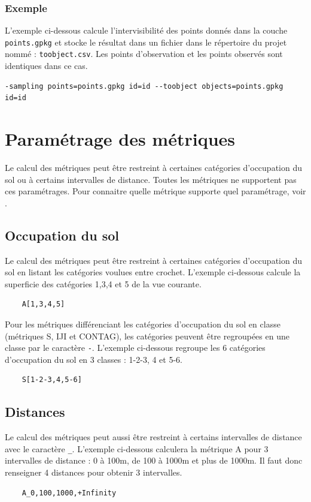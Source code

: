 \documentclass{report}
\begin{document}
\subsubsection{Exemple}
L'exemple ci-dessous calcule l'intervisibilité des points donnés dans la couche \verb|points.gpkg| et stocke le résultat dans un fichier dans le répertoire du projet nommé : \verb|toobject.csv|. Les points d'observation et les points observés sont identiques dans ce cas.
\begin{Verbatim}
-sampling points=points.gpkg id=id --toobject objects=points.gpkg id=id
\end{Verbatim}



\section{Paramétrage des métriques}
\label{param_metrics_cli}
Le calcul des métriques peut être restreint à certaines catégories d'occupation du sol ou à certains intervalles de distance. Toutes les métriques ne supportent pas ces paramétrages. Pour connaitre quelle métrique supporte quel paramétrage, voir .

\subsection{Occupation du sol}
Le calcul des métriques peut être restreint à certaines catégories d'occupation du sol en listant les catégories voulues entre crochet. L'exemple ci-dessous calcule la superficie des catégories 1,3,4 et 5 de la vue courante.
\begin{Verbatim}
	A[1,3,4,5]
\end{Verbatim}

Pour les métriques différenciant les catégories d'occupation du sol en classe (métriques S, IJI et CONTAG), les catégories peuvent être regroupées en une classe par le caractère \verb|-|. L'exemple ci-dessous regroupe les 6 catégories d'occupation du sol en 3 classes : 1-2-3, 4 et 5-6.
\begin{Verbatim}
	S[1-2-3,4,5-6]
\end{Verbatim}

\subsection{Distances}
Le calcul des métriques peut aussi être restreint à certains intervalles de distance avec le caractère \verb|_|. L'exemple ci-dessous calculera la métrique A pour 3 intervalles de distance : 0 à 100m, de 100 à 1000m et plus de 1000m. Il faut donc renseigner 4 distances pour obtenir 3 intervalles.
\begin{Verbatim}
	A_0,100,1000,+Infinity
\end{Verbatim}
\end{document}
